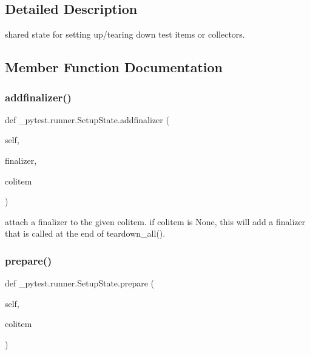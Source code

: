 \subsection{Detailed Description}
\begin{DoxyVerb}shared state for setting up/tearing down test items or collectors. \end{DoxyVerb}
 

\subsection{Member Function Documentation}
\mbox{\label{class__pytest_1_1runner_1_1_setup_state_aff0e87dd54e8ea40931e49a54dd95295}} 
\subsubsection{\texorpdfstring{addfinalizer()}{addfinalizer()}}
{\footnotesize\ttfamily def \+\_\+pytest.\+runner.\+Setup\+State.\+addfinalizer (\begin{DoxyParamCaption}\item[{}]{self,  }\item[{}]{finalizer,  }\item[{}]{colitem }\end{DoxyParamCaption})}

\begin{DoxyVerb}attach a finalizer to the given colitem.
if colitem is None, this will add a finalizer that
is called at the end of teardown_all().
\end{DoxyVerb}
 \mbox{\label{class__pytest_1_1runner_1_1_setup_state_a1620131dc4ab5a7186039ac330acc846}} 
\subsubsection{\texorpdfstring{prepare()}{prepare()}}
{\footnotesize\ttfamily def \+\_\+pytest.\+runner.\+Setup\+State.\+prepare (\begin{DoxyParamCaption}\item[{}]{self,  }\item[{}]{colitem }\end{DoxyParamCaption})}

